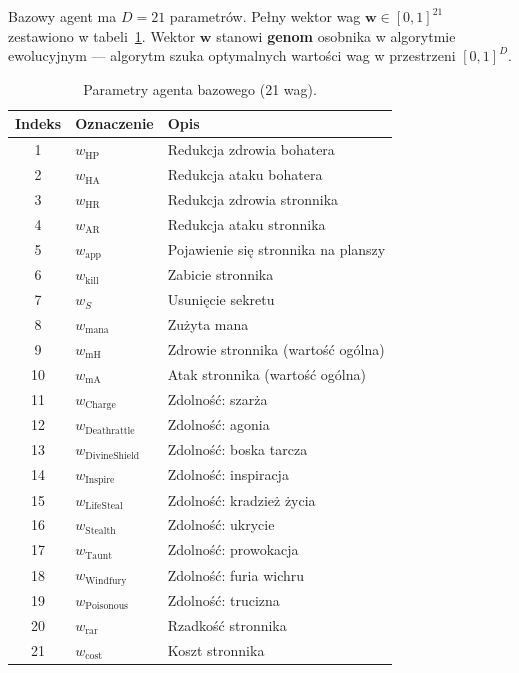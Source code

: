 Bazowy agent ma $D = 21$ parametrów. Pełny wektor wag $\mathbf{w} \in [0,1]^{21}$ zestawiono w tabeli~\ref{tab:weights21}. Wektor $\mathbf{w}$ stanowi \textbf{genom} osobnika w algorytmie ewolucyjnym --- algorytm szuka optymalnych wartości wag w przestrzeni $[0,1]^D$.

\begin{table}[h]
\centering
\caption{Parametry agenta bazowego (21 wag).}
\label{tab:weights21}
\begin{tabular}{cll}
\toprule
Indeks & Oznaczenie & Opis \\
\midrule
1  & $w_{\text{HP}}$            & Redukcja zdrowia bohatera \\
2  & $w_{\text{HA}}$            & Redukcja ataku bohatera \\
3  & $w_{\text{HR}}$            & Redukcja zdrowia stronnika \\
4  & $w_{\text{AR}}$            & Redukcja ataku stronnika \\
5  & $w_{\text{app}}$           & Pojawienie się stronnika na planszy \\
6  & $w_{\text{kill}}$          & Zabicie stronnika \\
7  & $w_S$                      & Usunięcie sekretu \\
8  & $w_{\text{mana}}$          & Zużyta mana \\
9  & $w_{\text{mH}}$            & Zdrowie stronnika (wartość ogólna) \\
10  & $w_{\text{mA}}$           & Atak stronnika (wartość ogólna) \\
11 & $w_{\text{Charge}}$        & Zdolność: szarża \\
12 & $w_{\text{Deathrattle}}$   & Zdolność: agonia \\
13 & $w_{\text{DivineShield}}$  & Zdolność: boska tarcza \\
14 & $w_{\text{Inspire}}$       & Zdolność: inspiracja \\
15 & $w_{\text{LifeSteal}}$     & Zdolność: kradzież życia \\
16 & $w_{\text{Stealth}}$       & Zdolność: ukrycie \\
17 & $w_{\text{Taunt}}$         & Zdolność: prowokacja \\
18 & $w_{\text{Windfury}}$      & Zdolność: furia wichru \\
19 & $w_{\text{Poisonous}}$     & Zdolność: trucizna \\
20 & $w_{\text{rar}}$           & Rzadkość stronnika \\
21 & $w_{\text{cost}}$          & Koszt stronnika \\

\bottomrule
\end{tabular}
\end{table}
